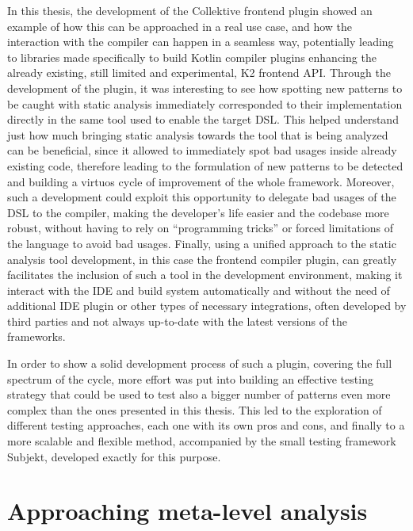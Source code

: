 \documentclass[12pt,a4paper,openright,twoside]{book}
\begin{document}
In this thesis, the development of the Collektive frontend plugin showed an
example of how this can be approached in a real use case, and how the
interaction with the compiler can happen in a seamless way, potentially leading
to libraries made specifically to build Kotlin compiler plugins enhancing the
already existing, still limited and experimental, K2 frontend API.
%
Through the development of the plugin, it was interesting to see how spotting
new patterns to be caught with static analysis immediately corresponded to their
implementation directly in the same tool used to enable the target \ac{DSL}.
This helped understand just how much bringing static analysis towards the tool
that is being analyzed can be beneficial, since it allowed to immediately spot
bad usages inside already existing code, therefore leading to the formulation of
new patterns to be detected and building a virtuos cycle of improvement of the
whole framework. Moreover, such a development could exploit this opportunity to
delegate bad usages of the \ac{DSL} to the compiler, making the developer's life
easier and the codebase more robust, without having to rely on ``programming
tricks'' or forced limitations of the language to avoid bad usages.
%
Finally, using a unified approach to the static analysis tool development, in 
this case the frontend compiler plugin, can greatly facilitates the inclusion 
of such a tool in the development environment, making it interact with the 
\ac{IDE} and build system automatically and without the need of additional
\ac{IDE} plugin or other types of necessary integrations, often developed by
third parties and not always up-to-date with the latest versions of the
frameworks.

In order to show a solid development process of such a plugin, covering the
full spectrum of the cycle, more effort was put into building an effective
testing strategy that could be used to test also a bigger number of patterns
even more complex than the ones presented in this thesis. This led to the 
exploration of different testing approaches, each one with its own pros and
cons, and finally to a more scalable and flexible method, accompanied by
the small testing framework Subjekt, developed exactly for this purpose.

\section{Approaching meta-level analysis}
\end{document}
